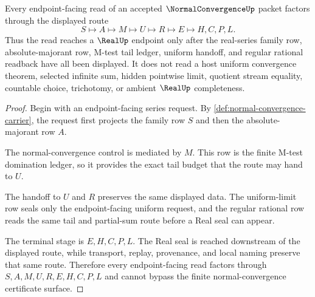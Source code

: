 \begin{theorem}
\label{thm:normal-convergence-uniform-series-handoff}
Every endpoint-facing read of an accepted $\NormalConvergenceUp$ packet factors through the displayed route
$$
S\longmapsto A\longmapsto M\longmapsto U\longmapsto R\longmapsto E\longmapsto H,C,P,L .
$$
Thus the read reaches a $\RealUp$ endpoint only after the real-series family row, absolute-majorant row, M-test tail ledger, uniform handoff, and regular rational readback have all been displayed. It does not read a host uniform convergence theorem, selected infinite sum, hidden pointwise limit, quotient stream equality, countable choice, trichotomy, or ambient $\RealUp$ completeness.
\end{theorem}

\begin{proof}
Begin with an endpoint-facing series request. By \autoref{def:normal-convergence-carrier}, the request first projects the family row $S$ and then the absolute-majorant row $A$.

The normal-convergence control is mediated by $M$. This row is the finite M-test domination ledger, so it provides the exact tail budget that the route may hand to $U$.

The handoff to $U$ and $R$ preserves the same displayed data. The uniform-limit row seals only the endpoint-facing uniform request, and the regular rational row reads the same tail and partial-sum route before a Real seal can appear.

The terminal stage is $E,H,C,P,L$. The Real seal is reached downstream of the displayed route, while transport, replay, provenance, and local naming preserve that same route. Therefore every endpoint-facing read factors through $S,A,M,U,R,E,H,C,P,L$ and cannot bypass the finite normal-convergence certificate surface.
\end{proof}


